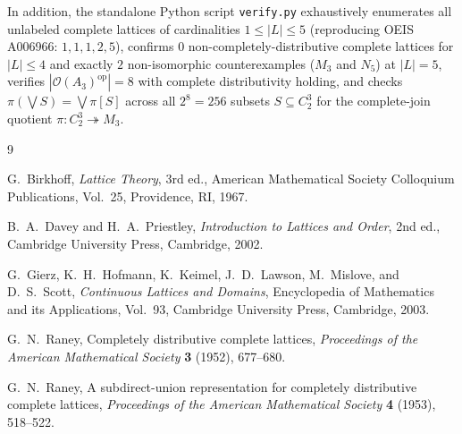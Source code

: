 \documentclass[11pt,a4paper]{article}
\theoremstyle{plain}
\theoremstyle{definition}
\newcommand{\op}{\mathrm{op}}
\newcommand{\Down}{\mathcal{O}}
\begin{document}
In addition, the standalone Python script \texttt{verify.py} exhaustively enumerates all
unlabeled complete lattices of cardinalities $1 \le |L| \le 5$ (reproducing OEIS A006966:
$1, 1, 1, 2, 5$), confirms $0$ non-completely-distributive complete lattices for $|L| \le 4$
and exactly $2$ non-isomorphic counterexamples ($M_3$ and $N_5$) at $|L| = 5$, verifies
$|\Down(A_3)^{\op}| = 8$ with complete distributivity holding, and checks $\pi(\bigvee S) = \bigvee \pi[S]$
across all $2^8 = 256$ subsets $S \subseteq C_2^3$ for the complete-join quotient $\pi : C_2^3 \twoheadrightarrow M_3$.

\begin{thebibliography}{9}

G.~Birkhoff,
\emph{Lattice Theory}, 3rd ed.,
American Mathematical Society Colloquium Publications, Vol.~25, Providence, RI, 1967.

B.~A.~Davey and H.~A.~Priestley,
\emph{Introduction to Lattices and Order}, 2nd ed.,
Cambridge University Press, Cambridge, 2002.

G.~Gierz, K.~H.~Hofmann, K.~Keimel, J.~D.~Lawson, M.~Mislove, and D.~S.~Scott,
\emph{Continuous Lattices and Domains},
Encyclopedia of Mathematics and its Applications, Vol.~93, Cambridge University Press, Cambridge, 2003.

G.~N.~Raney,
Completely distributive complete lattices,
\emph{Proceedings of the American Mathematical Society} \textbf{3} (1952), 677--680.

G.~N.~Raney,
A subdirect-union representation for completely distributive complete lattices,
\emph{Proceedings of the American Mathematical Society} \textbf{4} (1953), 518--522.

\end{thebibliography}
\end{document}
